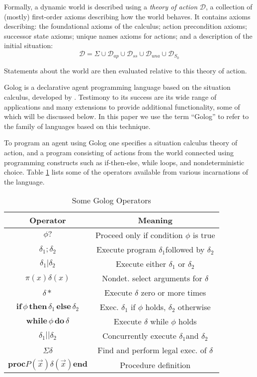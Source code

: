\documentclass[letterpaper]{article}
\begin{document}
Formally, a dynamic world is described using a \emph{theory of action}
$\mathcal{D}$, a collection of (mostly) first-order axioms describing
how the world behaves. It contains axioms describing: the foundational
axioms of the calculus; action precondition axioms; successor state
axioms; unique names axioms for actions; and a description of the
initial situation:
\begin{equation}
\label{eqn:sc_action_theory}
\mathcal{D}=\Sigma\cup\mathcal{D}_{ap}\cup\mathcal{D}_{ss}\cup\mathcal{D}_{una}\cup\mathcal{D}_{S_{0}}
\end{equation}

Statements about the world are then evaluated relative to this theory
of action.

Golog is a declarative agent programming language based on the situation
calculus, developed by \cite{levesque97golog}. Testimony
to its success are its wide range of applications and many extensions
to provide additional functionality, some of which will be discussed below.
In this paper we use the term ``Golog'' to refer to the family
of languages based on this technique.

To program an agent using Golog one specifies a situation calculus
theory of action, and a program consisting of actions from the world
connected using programming constructs such as if-then-else, while
loops, and nondeterministic choice. Table \ref{tbl:Golog-Operators}
lists some of the operators available from various incarnations of
the language.

\begin{table}[t]
\begin{center}\begin{tabular}{|c|c|}
\hline 
Operator&
Meaning\tabularnewline
\hline
\hline 
$\phi?$&
Proceed only if condition $\phi$ is true\tabularnewline
\hline 
$\delta_{1};\delta_{2}$&
Execute program $\delta_{1}$followed by $\delta_{2}$\tabularnewline
\hline 
$\delta_{1}|\delta_{2}$&
Execute either $\delta_{1}$ or $\delta_{2}$\tabularnewline
\hline 
$\pi(x)\delta(x)$&
Nondet. select arguments for $\delta$\tabularnewline
\hline 
$\delta*$&
Execute $\delta$ zero or more times\tabularnewline
\hline 
$\mathbf{if}\,\phi\,\mathbf{then}\,\delta_{1}\,\mathbf{else}\,\delta_{2}$&
Exec. $\delta_{1}$ if $\phi$ holds, $\delta_{2}$ otherwise\tabularnewline
\hline 
$\mathbf{while\,}\phi\mathbf{\, do}\,\delta$&
Execute $\delta$ while $\phi$ holds\tabularnewline
\hline 
$\delta_{1}||\delta_{2}$&
Concurrently execute $\delta_{1}$and $\delta_{2}$\tabularnewline
\hline 
$\Sigma\delta$&
Find and perform legal exec. of $\delta$\tabularnewline
\hline 
$\mathbf{proc}P(\overrightarrow{x})\delta(\overrightarrow{x})\mathbf{end}$&
Procedure definition\tabularnewline
\hline
\end{tabular}\end{center}


\caption{Some Golog Operators\label{tbl:Golog-Operators}}
\end{table}
\end{document}
